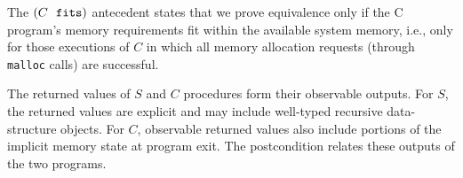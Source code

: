 The $(C\ \  \mathrm{\tt fits})$ antecedent states that we
prove equivalence only if the C program's memory requirements
fit within the available system memory, i.e.,
only for those executions of $C$ in which all
memory allocation requests (through {\tt malloc} calls)
are successful.

The returned values of $S$ and
$C$ procedures form their observable outputs.
For $S$, the returned values are
explicit and may include well-typed
recursive data-structure objects.
For $C$,
observable returned values also include portions
of the implicit memory state at
program exit. The postcondition relates these outputs of
the two programs.

